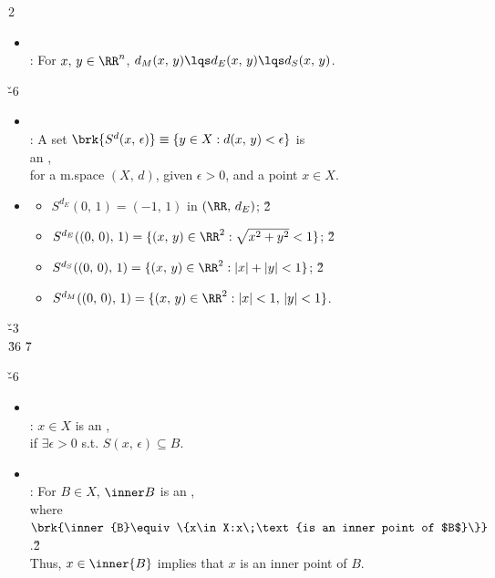 \documentclass[dvipdfmx,a4paper,titlepage,9pt]{jsarticle}
\begin{document}
\begin{multicols*}{2}
\begin{itemize}[label=-]
\item{} \\
: For $x,\,y\in\RR^n$, $d_M(x,\,y)\lqs d_E(x,\,y)\lqs d_S(x,\,y)$. \\

\end{itemize}

 \v{-6}
\begin{itemize}[label=-]
\item{} \\
: A set $\brk{S^d(x,\,\epsilon)}\equiv\{y\in X:d(x,\,y)<\epsilon\}$ is \\
\;\;an , \\
\;\;for a m.space $(X,\,d)$, given $\epsilon>0$, and a point $x\in X$. \\

\item{}
\begin{itemize}[label={\Cdot}]
\setlength{\leftskip}{-10pt}
\item$S^{d_E}(0,\,1)=(-1,\,1)$ in $(\RR,\,d_E)$; \v2
\item$S^{d_E}((0,\,0),\,1)=\{(x,\,y)\in\RR^2:\sqrt{x^2+y^2}<1\}$; \v2
\item$S^{d_S}((0,\,0),\,1)=\{(x,\,y)\in\RR^2:|x|+|y|<1\}$; \v2
\item$S^{d_M}((0,\,0),\,1)=\{(x,\,y)\in\RR^2:|x|<1,\,|y|<1\}$. \\
\end{itemize}
\end{itemize}

\newpage

 \v{-3}\\
\h{36} \v7

\v{-6}
\begin{itemize}[label=-]
\item{} \\
: $x\in X$ is an , \\
\;\;if $\exists\epsilon>0$ s.t. $S(x,\,\epsilon)\subseteq B$. \\

\item{} \\
: For $B\in X$, $\inner B$ is an , \\
\;\;where $\brk{\inner{B}\equiv\{x\in X:x\;\text{is an inner point of $B$}\}}$.\v2\\
\;\;Thus, $x\in \inner{B}$ implies that $x$ is an inner point of $B$. \\
\end{itemize}


\end{multicols*}
\end{document}
